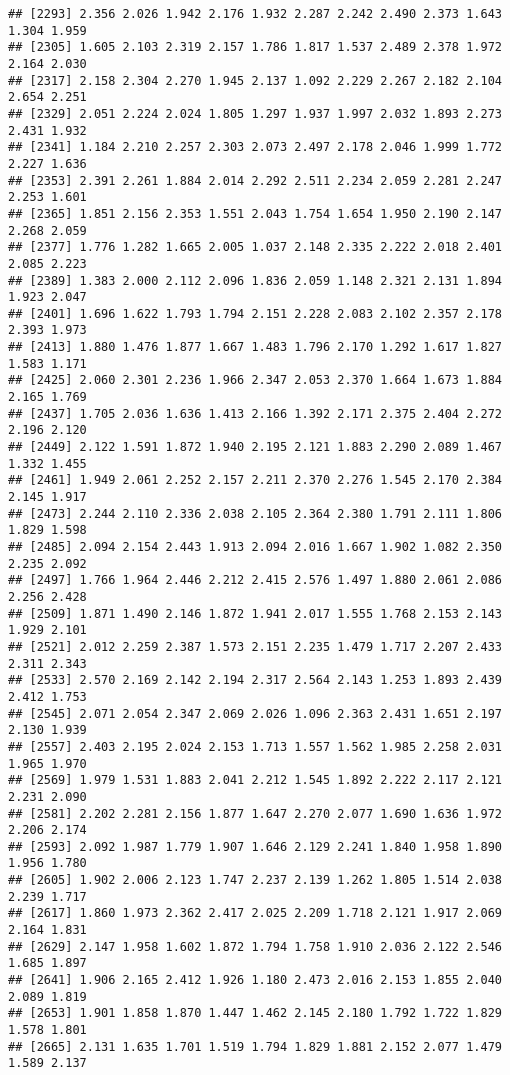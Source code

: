 \documentclass[
]{article}
\begin{document}
\begin{verbatim}
## [2293] 2.356 2.026 1.942 2.176 1.932 2.287 2.242 2.490 2.373 1.643 1.304 1.959
## [2305] 1.605 2.103 2.319 2.157 1.786 1.817 1.537 2.489 2.378 1.972 2.164 2.030
## [2317] 2.158 2.304 2.270 1.945 2.137 1.092 2.229 2.267 2.182 2.104 2.654 2.251
## [2329] 2.051 2.224 2.024 1.805 1.297 1.937 1.997 2.032 1.893 2.273 2.431 1.932
## [2341] 1.184 2.210 2.257 2.303 2.073 2.497 2.178 2.046 1.999 1.772 2.227 1.636
## [2353] 2.391 2.261 1.884 2.014 2.292 2.511 2.234 2.059 2.281 2.247 2.253 1.601
## [2365] 1.851 2.156 2.353 1.551 2.043 1.754 1.654 1.950 2.190 2.147 2.268 2.059
## [2377] 1.776 1.282 1.665 2.005 1.037 2.148 2.335 2.222 2.018 2.401 2.085 2.223
## [2389] 1.383 2.000 2.112 2.096 1.836 2.059 1.148 2.321 2.131 1.894 1.923 2.047
## [2401] 1.696 1.622 1.793 1.794 2.151 2.228 2.083 2.102 2.357 2.178 2.393 1.973
## [2413] 1.880 1.476 1.877 1.667 1.483 1.796 2.170 1.292 1.617 1.827 1.583 1.171
## [2425] 2.060 2.301 2.236 1.966 2.347 2.053 2.370 1.664 1.673 1.884 2.165 1.769
## [2437] 1.705 2.036 1.636 1.413 2.166 1.392 2.171 2.375 2.404 2.272 2.196 2.120
## [2449] 2.122 1.591 1.872 1.940 2.195 2.121 1.883 2.290 2.089 1.467 1.332 1.455
## [2461] 1.949 2.061 2.252 2.157 2.211 2.370 2.276 1.545 2.170 2.384 2.145 1.917
## [2473] 2.244 2.110 2.336 2.038 2.105 2.364 2.380 1.791 2.111 1.806 1.829 1.598
## [2485] 2.094 2.154 2.443 1.913 2.094 2.016 1.667 1.902 1.082 2.350 2.235 2.092
## [2497] 1.766 1.964 2.446 2.212 2.415 2.576 1.497 1.880 2.061 2.086 2.256 2.428
## [2509] 1.871 1.490 2.146 1.872 1.941 2.017 1.555 1.768 2.153 2.143 1.929 2.101
## [2521] 2.012 2.259 2.387 1.573 2.151 2.235 1.479 1.717 2.207 2.433 2.311 2.343
## [2533] 2.570 2.169 2.142 2.194 2.317 2.564 2.143 1.253 1.893 2.439 2.412 1.753
## [2545] 2.071 2.054 2.347 2.069 2.026 1.096 2.363 2.431 1.651 2.197 2.130 1.939
## [2557] 2.403 2.195 2.024 2.153 1.713 1.557 1.562 1.985 2.258 2.031 1.965 1.970
## [2569] 1.979 1.531 1.883 2.041 2.212 1.545 1.892 2.222 2.117 2.121 2.231 2.090
## [2581] 2.202 2.281 2.156 1.877 1.647 2.270 2.077 1.690 1.636 1.972 2.206 2.174
## [2593] 2.092 1.987 1.779 1.907 1.646 2.129 2.241 1.840 1.958 1.890 1.956 1.780
## [2605] 1.902 2.006 2.123 1.747 2.237 2.139 1.262 1.805 1.514 2.038 2.239 1.717
## [2617] 1.860 1.973 2.362 2.417 2.025 2.209 1.718 2.121 1.917 2.069 2.164 1.831
## [2629] 2.147 1.958 1.602 1.872 1.794 1.758 1.910 2.036 2.122 2.546 1.685 1.897
## [2641] 1.906 2.165 2.412 1.926 1.180 2.473 2.016 2.153 1.855 2.040 2.089 1.819
## [2653] 1.901 1.858 1.870 1.447 1.462 2.145 2.180 1.792 1.722 1.829 1.578 1.801
## [2665] 2.131 1.635 1.701 1.519 1.794 1.829 1.881 2.152 2.077 1.479 1.589 2.137

\end{verbatim}
\end{document}
